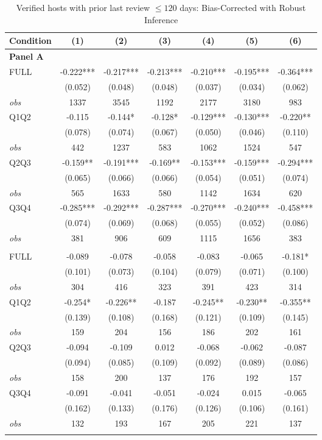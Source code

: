 \begin{table}[!htbp]
\centering
\caption{Verified hosts with prior last review $\leq120$ days: Bias-Corrected with Robust Inference}
\begin{tabular}{lcccccc}
\toprule
Condition & (1) & (2) & (3) & (4) & (5) & (6) \\
\midrule
\multicolumn{7}{l}{\textbf{Panel A}} \\

FULL & -0.222*** & -0.217*** & -0.213*** & -0.210*** & -0.195*** & -0.364*** \\
 & (0.052) & (0.048) & (0.048) & (0.037) & (0.034) & (0.062) \\
\textit{obs} & 1337 & 3545 & 1192 & 2177 & 3180 & 983 \\
Q1Q2 & -0.115 & -0.144* & -0.128* & -0.129*** & -0.130*** & -0.220** \\
 & (0.078) & (0.074) & (0.067) & (0.050) & (0.046) & (0.110) \\
\textit{obs} & 442 & 1237 & 583 & 1062 & 1524 & 547 \\
Q2Q3 & -0.159** & -0.191*** & -0.169** & -0.153*** & -0.159*** & -0.294*** \\
 & (0.065) & (0.066) & (0.066) & (0.054) & (0.051) & (0.074) \\
\textit{obs} & 565 & 1633 & 580 & 1142 & 1634 & 620 \\
Q3Q4 & -0.285*** & -0.292*** & -0.287*** & -0.270*** & -0.240*** & -0.458*** \\
 & (0.074) & (0.069) & (0.068) & (0.055) & (0.052) & (0.086) \\
\textit{obs} & 381 & 906 & 609 & 1115 & 1656 & 383 \\
\addlinespace
\multicolumn{7}{l}{\textbf{Panel B}} \\

FULL & -0.089 & -0.078 & -0.058 & -0.083 & -0.065 & -0.181* \\
 & (0.101) & (0.073) & (0.104) & (0.079) & (0.071) & (0.100) \\
\textit{obs} & 304 & 416 & 323 & 391 & 423 & 314 \\
Q1Q2 & -0.254* & -0.226** & -0.187 & -0.245** & -0.230** & -0.355** \\
 & (0.139) & (0.108) & (0.168) & (0.121) & (0.109) & (0.145) \\
\textit{obs} & 159 & 204 & 156 & 186 & 202 & 161 \\
Q2Q3 & -0.094 & -0.109 & 0.012 & -0.068 & -0.062 & -0.087 \\
 & (0.094) & (0.085) & (0.109) & (0.092) & (0.089) & (0.086) \\
\textit{obs} & 158 & 200 & 137 & 176 & 192 & 157 \\
Q3Q4 & -0.091 & -0.041 & -0.051 & -0.024 & 0.015 & -0.065 \\
 & (0.162) & (0.133) & (0.176) & (0.126) & (0.106) & (0.161) \\
\textit{obs} & 132 & 193 & 167 & 205 & 221 & 137 \\
\addlinespace
\multicolumn{7}{l}{\textbf{Panel C}} \\


\end{tabular}
\end{table}
